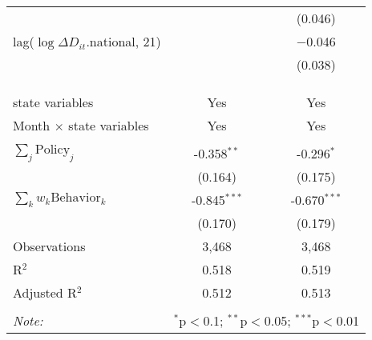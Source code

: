 \begin{tabular}{@{\extracolsep{1pt}}lcc}
  &  & (0.046) \\ 
  lag($\log \Delta D_{it}$.national, 21) &  & $-$0.046 \\ 
  &  & (0.038) \\ 
   &  &  \\ 
  &  &  \\ 
 \hline \\[-1.8ex] 
state variables & Yes & Yes \\ 
Month $\times$ state variables & Yes & Yes \\ 
\hline \\[-1.8ex] 
$\sum_j \mathrm{Policy}_j$ & -0.358$^{**}$ & -0.296$^{*}$ \\ 
 & (0.164) & (0.175) \\ 
$\sum_k w_k \mathrm{Behavior}_k$ & -0.845$^{***}$ & -0.670$^{***}$ \\ 
 & (0.170) & (0.179) \\ 
Observations & 3,468 & 3,468 \\ 
R$^{2}$ & 0.518 & 0.519 \\ 
Adjusted R$^{2}$ & 0.512 & 0.513 \\ 
\hline 
\hline \\[-1.8ex] 
\textit{Note:}  & \multicolumn{2}{r}{$^{*}$p$<$0.1; $^{**}$p$<$0.05; $^{***}$p$<$0.01} \\ 
\end{tabular} 